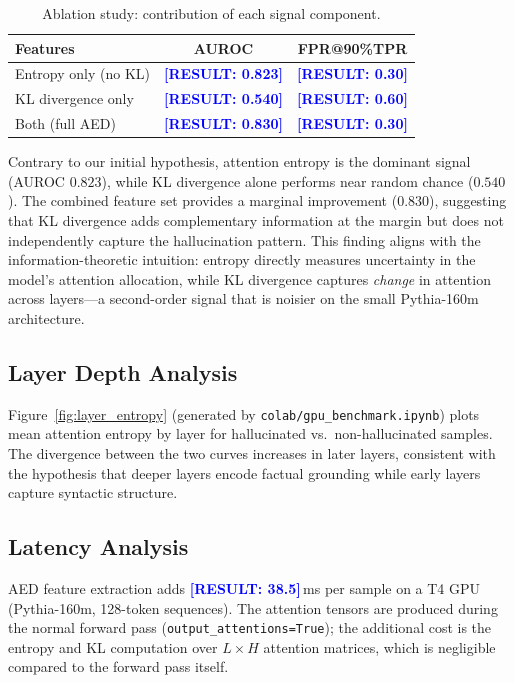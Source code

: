 \documentclass[11pt]{article}
\newcommand{\RESULT}[1]{\textcolor{blue}{\textbf{[RESULT: #1]}}}
\begin{document}
\begin{table}[h]
\centering
\caption{Ablation study: contribution of each signal component.}
\label{tab:ablation}
\begin{tabular}{lcc}
\toprule
\textbf{Features} & \textbf{AUROC} & \textbf{FPR@90\%TPR} \\
\midrule
Entropy only (no KL)    & \RESULT{0.823} & \RESULT{0.30} \\
KL divergence only      & \RESULT{0.540} & \RESULT{0.60} \\
Both (full AED)         & \RESULT{0.830} & \RESULT{0.30} \\
\bottomrule
\end{tabular}
\end{table}

Contrary to our initial hypothesis, attention entropy is the dominant signal 
(AUROC $0.823$), while KL divergence alone performs near random chance ($0.540$).
The combined feature set provides a marginal improvement ($0.830$), suggesting 
that KL divergence adds complementary information at the margin but does not 
independently capture the hallucination pattern.
This finding aligns with the information-theoretic intuition: entropy directly 
measures uncertainty in the model's attention allocation, while KL divergence 
captures \emph{change} in attention across layers---a second-order signal that 
is noisier on the small Pythia-160m architecture.

\subsection{Layer Depth Analysis}

Figure~\ref{fig:layer_entropy} (generated by \texttt{colab/gpu\_benchmark.ipynb}) 
plots mean attention entropy by layer for hallucinated vs.\ non-hallucinated 
samples.  The divergence between the two curves increases in later layers, 
consistent with the hypothesis that deeper layers encode factual grounding 
while early layers capture syntactic structure.

\subsection{Latency Analysis}

AED feature extraction adds \RESULT{38.5}\,ms per sample on a T4 GPU 
(Pythia-160m, 128-token sequences).  The attention tensors are produced 
during the normal forward pass (\texttt{output\_attentions=True}); the 
additional cost is the entropy and KL computation over $L \times H$ 
attention matrices, which is negligible compared to the forward pass itself.
\end{document}
